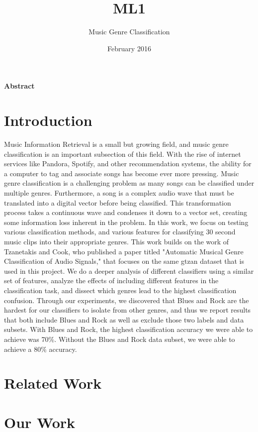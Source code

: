 \documentclass{article}
\title{ML1}
\author{Music Genre Classification}
\date{February 2016}
\begin{document}
\maketitle

\begin{multicols}{2}
\textbf{Abstract}
\section{Introduction}
Music Information Retrieval is a small but growing field, and music genre classification is an important subsection of this field. With the rise of internet services like Pandora, Spotify, and other recommendation systems, the ability for a computer to tag and associate songs has become ever more pressing. Music genre classification is a challenging problem as many songs can be classified under multiple genres. Furthermore, a song is a complex audio wave that must be translated into a digital vector before being classified. This transformation process takes a continuous wave and condenses it down to a vector set, creating some information loss inherent in the problem. In this work, we focus on testing various classification methods, and various features for classifying 30 second music clips into their appropriate genres. This work builds on the work of Tzanetakis and Cook, who published a paper titled "Automatic Musical Genre Classification of Audio Signals," that focuses on the same gtzan dataset that is used in this project. We do a deeper analysis of different classifiers using a similar set of features, analyze the effects of including different features in the classification task, and dissect which genres lead to the highest classification confusion. Through our experiments, we discovered that Blues and Rock are the hardest for our classifiers to isolate from other genres, and thus we report results that both include Blues and Rock as well as exclude those two labels and data subsets. With Blues and Rock, the highest classification accuracy we were able to achieve was 70\%. Without the Blues and Rock data subset, we were able to achieve a 80\% accuracy. 
\section{Related Work}


\section{Our Work}

\end{multicols}
\end{document}
